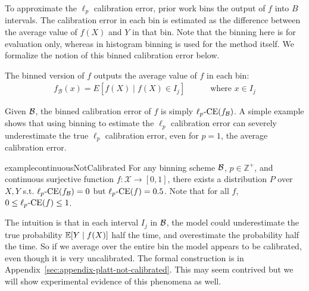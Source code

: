 To approximate the $\ell_p$ calibration error, prior work bins the output of $f$ into $B$ intervals.
The calibration error in each bin is estimated as the difference between the average value of $f(X)$ and $Y$ in that bin.
Note that the binning here is for evaluation only, whereas in histogram binning is used for the method itself.
We formalize the notion of this binned calibration error below.


\begin{definition}
The binned version of $f$ outputs the average value of $f$ in each bin:
\begin{align}
f_{\mathcal{B}}(x) = E[f(X) \mid f(X) \in I_j] \quad\quad\quad \mbox{where }x \in I_j
\end{align} 
\end{definition}

Given $\mathcal{B}{}$, the binned calibration error of $f$ is simply $\ell_p\mbox{-CE}(f_{\mathcal{B}{}})$.
A simple example shows that using binning to estimate the $\ell_p$ calibration error can severely underestimate the true $\ell_p$ calibration error, even for $p=1$, the average calibration error.

\begin{restatable}{example}{continuousNotCalibrated}
\label{ex:continuous-not-calibrated}
For any binning scheme $\mathcal{B}{}$, $p \in \mathbb{Z}^+$, and continuous surjective function $f : \mathcal{X} \to [0, 1]$, there exists a distribution $P$ over $X, Y$ s.t. $\ell_p\mbox{-CE}(f_{\mathcal{B}{}}) = 0$ but $\ell_p\mbox{-CE}(f) = 0.5$.
Note that for all $f$, $0 \leq \ell_p\mbox{-CE}(f) \leq 1$.
\end{restatable}

The intuition is that in each interval $I_j$ in $\mathcal{B}{}$, the model could underestimate the true probability $\mathbb{E}[Y \mid f(X)]$ half the time, and overestimate the probability half the time. So if we average over the entire bin the model appears to be calibrated, even though it is very uncalibrated. The formal construction is in Appendix~\ref{sec:appendix-platt-not-calibrated}. This may seem contrived but we will show experimental evidence of this phenomena as well.

